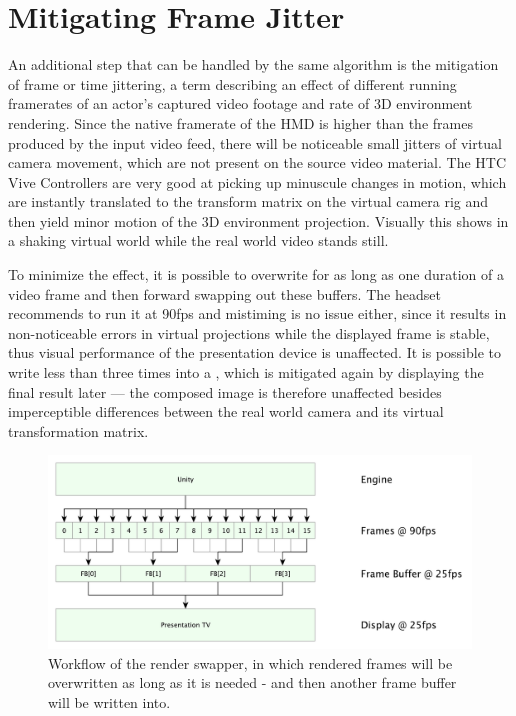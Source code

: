 %
\newpage
\section{Mitigating Frame Jitter}
\label{sec:framejitter}

An additional step that can be handled by the same algorithm is the mitigation 
of frame or time jittering, a term describing an effect of different running 
framerates of an actor's captured video footage and rate of 3D environment 
rendering. Since the native framerate of the HMD is higher than the frames 
produced by the input video feed, there will be noticeable small jitters of 
virtual camera movement, which are not present on the source video material. 
The HTC Vive Controllers are very good at picking up minuscule changes in 
motion, which are instantly translated to the transform matrix on the virtual 
camera rig and then yield minor motion of the 3D environment projection. 
Visually this shows in a shaking virtual world while the real world video 
stands still.

To minimize the effect, it is possible to overwrite  for 
as long as one duration of a video frame and then forward swapping out these 
buffers. The headset recommends to run it at 90fps and mistiming is no 
issue either, since it results in non-noticeable errors in virtual projections 
while the displayed frame is stable, thus visual performance of the 
presentation device is unaffected. It is possible to write less than three 
times into a , which is mitigated again by displaying the 
final result later --- the composed image is therefore unaffected besides 
imperceptible differences between the real world camera and its virtual 
transformation matrix.

\begin{figure}[htb]
	\centering
	\includegraphics[width=\textwidth]{gfx/Delay_Mitigation.pdf}
	\caption{Workflow of the render swapper, in which rendered frames will be 
		overwritten as long as it is needed - and then another frame buffer 
		will be written into.}
	\label{fig:offsets:framesquashing}
\end{figure}
